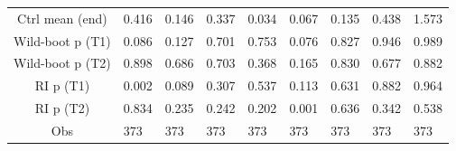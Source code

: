 {\begin{tabular}{@{}S*{8}{P}@{}}
Ctrl mean (end)     &       0.416         &       0.146         &       0.337         &       0.034         &       0.067         &       0.135         &       0.438         &       1.573         \\
Wild-boot p (T1)    &       0.086         &       0.127         &       0.701         &       0.753         &       0.076         &       0.827         &       0.946         &       0.989         \\
Wild-boot p (T2)    &       0.898         &       0.686         &       0.703         &       0.368         &       0.165         &       0.830         &       0.677         &       0.882         \\
RI p (T1)           &       0.002         &       0.089         &       0.307         &       0.537         &       0.113         &       0.631         &       0.882         &       0.964         \\
RI p (T2)           &       0.834         &       0.235         &       0.242         &       0.202         &       0.001         &       0.636         &       0.342         &       0.538         \\
Obs                 &         373         &         373         &         373         &         373         &         373         &         373         &         373         &         373         \\
\bottomrule
\end{tabular}
}

